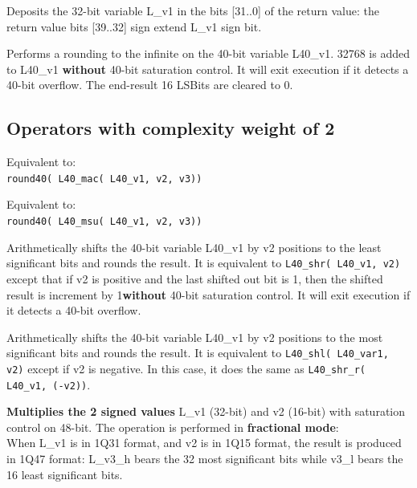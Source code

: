 Deposits the 32-bit variable L\_v1 in the bits [31..0] of the return value: the return value bits [39..32] sign extend L\_v1 sign bit.


Performs a rounding to the infinite on the 40-bit variable L40\_v1.
32768 is added to L40\_v1 \textbf{without} 40-bit saturation control.
It will exit execution if it detects a 40-bit overflow.
The end-result 16 LSBits are cleared to 0.


\subsection{Operators with complexity weight of 2}


Equivalent to: \\
{\tt round40( L40\_mac( L40\_v1, v2, v3)) }


Equivalent to: \\
{\tt round40( L40\_msu( L40\_v1, v2, v3)) }


Arithmetically shifts the 40-bit variable L40\_v1 by v2 positions to the least significant bits and rounds the result.
It is equivalent to {\tt L40\_shr( L40\_v1, v2)} except that if v2 is positive and the last shifted out bit is 1, then the shifted result is increment by 1\textbf{without} 40-bit saturation control.
It will exit execution if it detects a 40-bit overflow.


Arithmetically shifts the 40-bit variable L40\_v1 by v2 positions to the most significant bits and rounds the result.
It is equivalent to {\tt L40\_shl( L40\_var1, v2)} except if v2 is negative.
In this case, it does the same as {\tt L40\_shr\_r( L40\_v1, (-v2))}.


\textbf{Multiplies the 2 signed values} L\_v1 (32-bit) and v2 (16-bit) with saturation control on 48-bit.
The operation is performed in \textbf{fractional mode}: \\
When L\_v1 is in 1Q31 format, and v2 is in 1Q15 format, the result is produced in 1Q47 format: L\_v3\_h bears the 32 most significant bits while v3\_l bears the 16 least significant bits.

